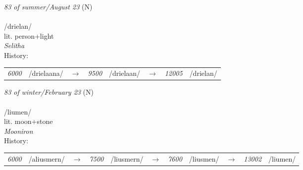 \vspace{15pt}
\begin{nopagebreak}
 \textit{83 of summer/August 23} (N)\\
\\
\noindent /dri{\textprimstress}elan/\\
\noindent lit. person+light\\
\noindent \textit{Selitha}\\


\noindent History:

\vspace{-0pt}
\hspace{40pt}
\begin{tabular}{ccc}
\textit{6000} & /drielaana/&$\rightarrow$ & \textit{9500} & /drielaan/&$\rightarrow$ & \textit{12005} & /drielan/& \\
\end{tabular}

\vspace{20pt}\hline

\end{nopagebreak}
\filbreak



\vspace{15pt}
\begin{nopagebreak}
 \textit{83 of winter/February 23} (N)\\
\\
\noindent /li{\textprimstress}umen/\\
\noindent lit. moon+stone\\
\noindent \textit{Mooniron}\\


\noindent History:

\vspace{-0pt}
\hspace{40pt}
\begin{tabular}{ccc}
\textit{6000} & /aliusmern/&$\rightarrow$ & \textit{7500} & /liusmern/&$\rightarrow$ & \textit{7600} & /liusmen/&$\rightarrow$ & \textit{13002} & /liumen/& \\
\end{tabular}

\vspace{20pt}\hline

\end{nopagebreak}
\filbreak



